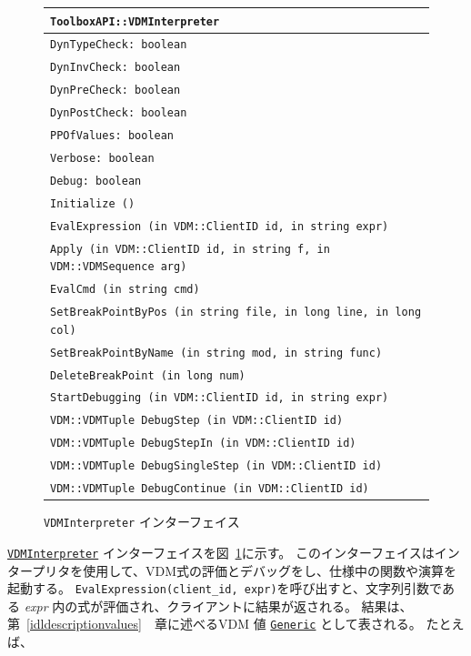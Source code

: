 \documentclass[\pformat,12pt]{jarticle}
\newcommand{\Generic}{\hyperlink{interface.Generic}{Generic}}
\newcommand{\VDMInterpreter}{\hyperlink{interface.VDMInterpreter}{VDMInterpreter}}
\begin{document}
\begin{figure}[tbh]
\begin{center}
\begin{tabular}{|l|}
\hline
{\tt ToolboxAPI::VDMInterpreter } \\
\hline
{\tt DynTypeCheck: boolean } \\
{\tt DynInvCheck: boolean } \\
{\tt DynPreCheck: boolean } \\
{\tt DynPostCheck: boolean } \\
{\tt PPOfValues: boolean } \\
{\tt Verbose: boolean } \\
{\tt Debug: boolean } \\
\hline
{\tt Initialize () } \\
{\tt EvalExpression (in VDM::ClientID id, in string expr) } \\
{\tt Apply (in VDM::ClientID id, in string f, in VDM::VDMSequence arg) } \\
{\tt EvalCmd (in string cmd) } \\
{\tt SetBreakPointByPos (in string file, in long line, in long col) } \\
{\tt SetBreakPointByName (in string mod, in string func) } \\
{\tt DeleteBreakPoint (in long num) } \\
{\tt StartDebugging (in VDM::ClientID id, in string expr) } \\
{\tt VDM::VDMTuple DebugStep (in VDM::ClientID id) } \\
{\tt VDM::VDMTuple DebugStepIn (in VDM::ClientID id) } \\
{\tt VDM::VDMTuple DebugSingleStep (in VDM::ClientID id) } \\
{\tt VDM::VDMTuple DebugContinue (in VDM::ClientID id) } \\
\hline
\end{tabular}
\caption{{\tt VDMInterpreter} インターフェイス}\label{fig:VDMInterpreter}
\end{center}
\end{figure}

 {\tt \VDMInterpreter} インターフェイスを図~\ref{fig:VDMInterpreter}に示す。
このインターフェイスはインタープリタを使用して、VDM式の評価とデバッグをし、仕様中の関数や演算を起動する。
{\tt EvalExpression(client\_id, expr)}を呼び出すと、文字列引数である {\em expr} 内の式が評価され、クライアントに結果が返される。
結果は、第~\ref{idldescriptionvalues}　章に述べるVDM 値 {\tt \Generic} として表される。
たとえば、
\end{document}
